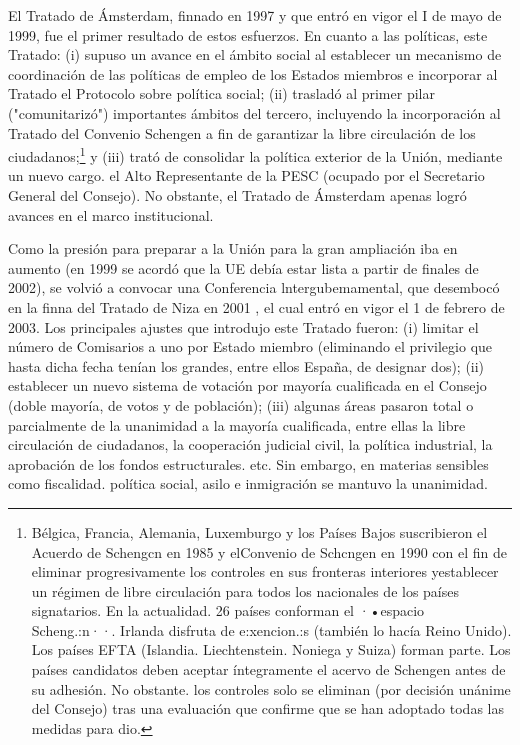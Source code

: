 \documentclass[10pt,a4paper]{article}
\begin{document}
El Tratado de Ámsterdam, finnado en 1997 y que entró en vigor el I de mayo de 1999, fue el primer resultado de estos esfuerzos. En cuanto a las políticas, este Tratado: (i) supuso un avance en el ámbito social al establecer un mecanismo de coordinación de las políticas de empleo de los Estados miembros e incorporar al Tratado el Protocolo sobre política social; (ii) trasladó al primer pilar ("comunitarizó") importantes ámbitos del tercero, incluyendo la incorporación al Tratado del Convenio Schengen a fin de garantizar la libre circulación de los ciudadanos;\footnote{%
    Bélgica, Francia, Alemania, Luxemburgo y los Países Bajos suscribieron el Acuerdo de Schengcn en 1985 y elConvenio de Schcngen en 1990 con el fin de eliminar progresivamente los controles en sus fronteras interiores yestablecer un régimen de libre circulación para todos los nacionales de los países signatarios. En la actualidad. 26 países conforman el ·•espacio Scheng.:n··. Irlanda disfruta de e:xencion.:s (también lo hacía Reino Unido). Los países EFTA (Islandia. Liechtenstein. Noniega y Suiza) forman parte. Los países candidatos deben aceptar íntegramente el acervo de Schengen antes de su adhesión. No obstante. los controles solo se eliminan (por decisión unánime del Consejo) tras una evaluación que confirme que se han adoptado todas las medidas para dio.
} y (iii) trató de consolidar la política exterior de la Unión, mediante un nuevo cargo. el Alto Representante de la PESC (ocupado por el Secretario General del Consejo). No obstante, el Tratado de Ámsterdam apenas logró avances en el marco institucional.

Como la presión para preparar a la Unión para la gran ampliación iba en aumento (en 1999 se acordó que la UE debía estar lista a partir de finales de 2002), se volvió a convocar una Conferencia lntergubemamental, que desembocó en la finna del Tratado de Niza en 2001 , el cual entró en vigor el 1 de febrero de 2003. Los principales ajustes que introdujo este Tratado fueron: (i) limitar el número de Comisarios a uno por Estado miembro (eliminando el privilegio que hasta dicha fecha tenían los grandes, entre ellos España, de designar dos); (ii) establecer un nuevo sistema de votación por mayoría cualificada en el Consejo (doble mayoría, de votos y de población); (iii) algunas áreas pasaron total o parcialmente de la unanimidad a la mayoría cualificada, entre ellas la libre circulación de ciudadanos, la cooperación judicial civil, la política industrial, la aprobación de los fondos estructurales. etc. Sin embargo, en materias sensibles como fiscalidad. política social, asilo e inmigración se mantuvo la unanimidad.
\end{document}
